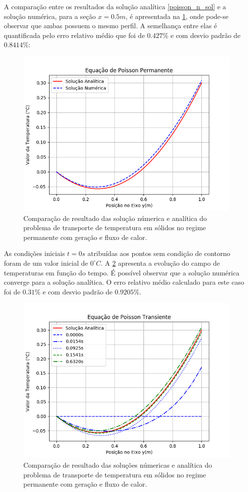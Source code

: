 A comparação entre os resultados da solução analítica \eqref{poisson_n_sol} e a solução numérica, para a seção $x=0.5m$, é apresentada na \ref{poisson_n_perm_comp}, onde pode-se observar que ambas possuem o mesmo perfil.
A semelhança entre elas é quantificada pelo erro relativo médio que foi de $0.427\%$ e com desvio padrão de $0.8414\%$:
\begin{figure}[H]
    \centering
    \includegraphics[width=.7\linewidth]{figures/poisson_neumann_permanent_comparison.png}
    \caption{Comparação de resultado das solução númerica e analítica do problema de transporte de temperatura em sólidos no regime permanente com geração e fluxo de calor.}
    \label{poisson_n_perm_comp}
\end{figure}

As condições iniciais $t=0s$ atribuídas aos pontos sem condição de contorno foram de um valor inicial de $0^{\circ}C$.
A \ref{poisson_n_trans_comp} apresenta a evolução do campo de temperaturas em função do tempo.
É possível observar que a solução numérica converge para a solução analítica.
O erro relativo médio calculado para este caso foi de $0.31\%$ e com desvio padrão de $0.9205\%$.
\begin{figure}[H]
    \centering
    \includegraphics[width=.7\linewidth]{figures/poisson_neumann_transient_comparison.png}
    \caption{Comparação de resultado das soluções númericas e analítica do problema de transporte de temperatura em sólidos no regime permanente com geração e fluxo de calor.}
    \label{poisson_n_trans_comp}
\end{figure}

